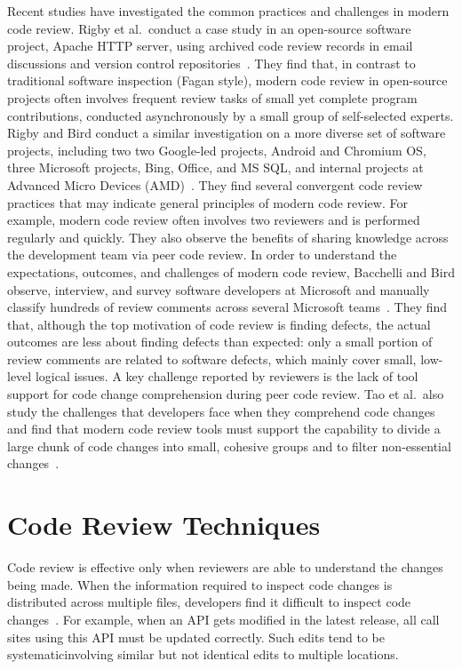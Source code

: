 \documentclass[11pt]{article}
\begin{document}
Recent studies have investigated the common practices and challenges in modern code review. Rigby et al.~conduct a case study in an open-source software project, Apache HTTP server, using archived code review records in email discussions and version control repositories~\cite{rigby2008open}. They find that, in contrast to traditional software inspection (Fagan style), modern code review in open-source projects often involves frequent review tasks of small yet complete program contributions, conducted asynchronously by a small group of self-selected experts. Rigby and Bird conduct a similar investigation on a more diverse set of software projects, including two two Google-led projects, Android and Chromium OS, three Microsoft projects, Bing, Office, and MS SQL, and internal projects at Advanced Micro Devices (AMD)~\cite{rigby2013convergent}. They find several convergent code review practices that may indicate general principles of modern code review. For example, modern code review often involves two reviewers and is performed regularly and quickly. They also observe the benefits of sharing knowledge across the development team via peer code review. In order to understand the expectations, outcomes, and challenges of modern code review, Bacchelli and Bird observe, interview, and survey software developers at Microsoft and manually classify hundreds of review comments across several Microsoft teams~\cite{bacchelli2013expectations}. They find that, although the top motivation of code review is finding defects, the actual outcomes are less about finding defects than expected: only a small portion of review comments are related to software defects, which mainly cover small, low-level logical issues. A key challenge reported by reviewers is the lack of tool support for code change comprehension during peer code review. Tao et al.~also study the challenges that developers face when they comprehend code changes and find that modern code review tools must support the capability to divide a large chunk of code changes into small, cohesive groups and to filter non-essential changes~\cite{tao2012software}. 

\section{Code Review Techniques}

Code review is effective only when reviewers are able to understand the changes being made. When the information required to inspect code changes is distributed across multiple files, developers find it difficult to inspect code changes~\cite{dunsmore2000object}. For example, when an API gets modified in the latest release, all call sites using this API must be updated correctly. Such edits tend to be systematic\textemdash involving similar but not identical edits to multiple locations.
\end{document}
